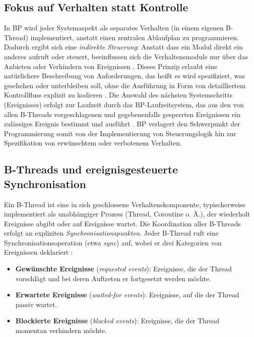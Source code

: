 \subsection{Fokus auf Verhalten statt Kontrolle}\label{subsec:fokus-auf-verhalten-statt-kontrolle}
In BP wird jeder Systemaspekt als separates Verhalten (in einem eigenen B-Thread) implementiert, anstatt einen zentralen Ablaufplan zu programmieren.
Dadurch ergibt sich eine \emph{indirekte Steuerung}: Anstatt dass ein Modul direkt ein anderes aufruft oder steuert, beeinflussen sich die Verhaltensmodule nur über das Anbieten oder Verhindern von Ereignissen \cite{Harel2012}.
Dieses Prinzip erlaubt eine natürlichere Beschreibung von Anforderungen, das heißt es wird spezifiziert, was geschehen oder unterbleiben soll, ohne die Ausführung in Form von detailliertem Kontrollfluss explizit zu kodieren \cite{Harel2012}.
Die Auswahl des nächsten Systemschritts (Ereignisses) erfolgt zur Laufzeit durch das BP-Laufzeitsystem, das aus den von allen B-Threads vorgeschlagenen und gegebenenfalls gesperrten Ereignissen ein zulässiges Ereignis bestimmt und ausführt \cite{Harel2012}.
BP verlagert den Schwerpunkt der Programmierung somit von der Implementierung von Steuerungslogik hin zur Spezifikation von erwünschtem oder verbotenem Verhalten.

\subsection{B-Threads und ereignisgesteuerte Synchronisation}\label{subsec:b-threads-und-ereignisgesteuerte-synchronisation}
Ein B-Thread ist eine in sich geschlossene Verhaltenskomponente, typischerweise implementiert als unabhängiger Prozess (Thread, Coroutine o. Ä.), der wiederholt Ereignisse abgibt oder auf Ereignisse wartet.
Die Koordination aller B-Threads erfolgt an expliziten \emph{Synchronisationspunkten}.
Jeder B-Thread ruft eine Synchronisationsoperation (etwa \emph{sync}) auf, wobei er drei Kategorien von Ereignissen deklariert \cite{Harel2010}:
\begin{itemize}
  \item \textbf{Gewünschte Ereignisse} (\emph{requested events}): Ereignisse, die der Thread vorschlägt und bei deren Auftreten er fortgesetzt werden möchte.
  \item \textbf{Erwartete Ereignisse} (\emph{waited-for events}): Ereignisse, auf die der Thread passiv wartet.
  \item \textbf{Blockierte Ereignisse} (\emph{blocked events}): Ereignisse, die der Thread momentan verhindern möchte.
\end{itemize}

